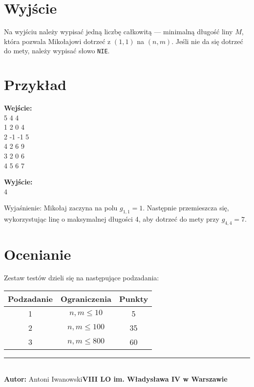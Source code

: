 \documentclass[a4paper,11pt]{article}
\newcommand{\exampleinput}{\\5 4 4
\\1 2 0 4
\\2 -1 -1 5
\\4 2 6 9
\\3 2 0 6
\\4 5 6 7}
\newcommand{\exampleoutput}{\\4}
\newcommand{\explanation}{Mikołaj zaczyna na polu \( g_{1,1} = 1 \). Następnie przemieszcza się, wykorzystując linę o maksymalnej długości 4, aby dotrzeć do mety przy \( g_{4,4} = 7 \).}
\newcommand{\authorinfo}{Antoni Iwanowski}
\newcommand{\schoolinfo}{VIII LO im. Władysława IV w Warszawie}
\newcommand{\subtasktable}{%
\begin{tabular}{|c|c|c|}
\hline
Podzadanie & Ograniczenia & Punkty \\
\hline
1 & $n, m \leq 10$ & 5 \\
2 & $n, m \leq 100$ & 35 \\
3 & $n, m \leq 800$ & 60 \\
\hline
\end{tabular}}
\begin{document}
\section*{Wyjście}
Na wyjściu należy wypisać jedną liczbę całkowitą — minimalną długość liny \( M \), która pozwala Mikołajowi dotrzeć z \( (1, 1) \) na \( (n, m) \). Jeśli nie da się dotrzeć do mety, należy wypisać słowo \texttt{NIE}.
\newpage
\section*{Przykład}
\vspace{-0.5cm}
\begin{multicols}{2}
\noindent\textbf{Wejście:}
\exampleinput

\columnbreak

\noindent\textbf{Wyjście:}
\exampleoutput
\end{multicols}

\noindent Wyjaśnienie: \explanation

\section*{Ocenianie}
Zestaw testów dzieli się na następujące podzadania:
\begin{center}
\subtasktable
\end{center}

\vspace*{\fill}
\noindent \rule{\textwidth}{0.4pt} \\
\textbf{Autor:} \authorinfo  \hfill \textbf{\schoolinfo} \\
\end{document}
